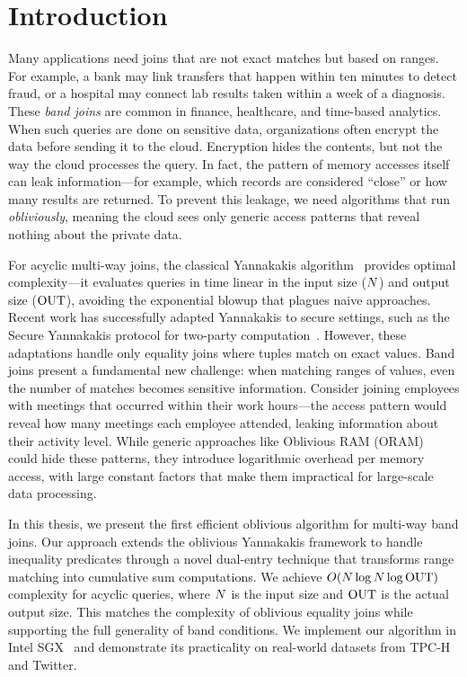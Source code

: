 \chapter{Introduction}

Many applications need joins that are not exact matches but based on ranges. For example, a bank may link transfers that happen within ten minutes to detect fraud, or a hospital may connect lab results taken within a week of a diagnosis. These \emph{band joins} are common in finance, healthcare, and time-based analytics. When such queries are done on sensitive data, organizations often encrypt the data before sending it to the cloud. Encryption hides the contents, but not the way the cloud processes the query. In fact, the pattern of memory accesses itself can leak information---for example, which records are considered ``close'' or how many results are returned. To prevent this leakage, we need algorithms that run \emph{obliviously}, meaning the cloud sees only generic access patterns that reveal nothing about the private data.

For acyclic multi-way joins, the classical Yannakakis algorithm~\cite{yannakakis1981} provides optimal complexity---it evaluates queries in time linear in the input size ($N$) and output size ($\text{OUT}$), avoiding the exponential blowup that plagues naive approaches. Recent work has successfully adapted Yannakakis to secure settings, such as the Secure Yannakakis protocol for two-party computation~\cite{wang2021secure}. However, these adaptations handle only equality joins where tuples match on exact values. Band joins present a fundamental new challenge: when matching ranges of values, even the number of matches becomes sensitive information. Consider joining employees with meetings that occurred within their work hours---the access pattern would reveal how many meetings each employee attended, leaking information about their activity level. While generic approaches like Oblivious RAM (ORAM)~\cite{goldreich1996} could hide these patterns, they introduce logarithmic overhead per memory access, with large constant factors that make them impractical for large-scale data processing.

In this thesis, we present the first efficient oblivious algorithm for multi-way band joins. Our approach extends the oblivious Yannakakis framework to handle inequality predicates through a novel dual-entry technique that transforms range matching into cumulative sum computations. We achieve $O(N \log N \log \text{OUT})$ complexity for acyclic queries, where $N$ is the input size and $\text{OUT}$ is the actual output size. This matches the complexity of oblivious equality joins while supporting the full generality of band conditions. We implement our algorithm in Intel SGX~\cite{sgx2016} and demonstrate its practicality on real-world datasets from TPC-H and Twitter.

